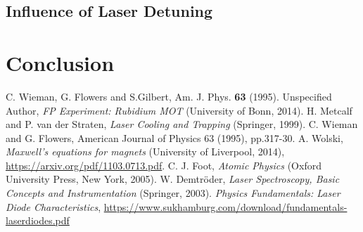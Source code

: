 \documentclass[twocolumn]{article}
\begin{document}
\subsection{Influence of Laser Detuning}

\section{Conclusion}
\begin{thebibliography}{9}
C. Wieman, G. Flowers and S.Gilbert, Am. J. Phys. \textbf{63} (1995).
Unspecified Author, \textsl{FP Experiment: Rubidium MOT} (University of Bonn, 2014).
H. Metcalf and P. van der Straten, \textsl{Laser Cooling and Trapping} (Springer, 1999).
C. Wieman and G. Flowers, American Journal of Physics 63 (1995), pp.317-30.
A. Wolski, \textsl{Maxwell's equations for magnets} (University of Liverpool, 2014), \url{https://arxiv.org/pdf/1103.0713.pdf}.
C. J. Foot, \textsl{Atomic Physics} (Oxford University Press, New York, 2005).
W. Demtröder, \textsl{Laser Spectroscopy, Basic Concepts and Instrumentation} (Springer, 2003).%
\textsl{Physics Fundamentals: Laser Diode Characteristics}, \url{https://www.sukhamburg.com/download/fundamentals-laserdiodes.pdf}

\end{thebibliography}
\end{document}
